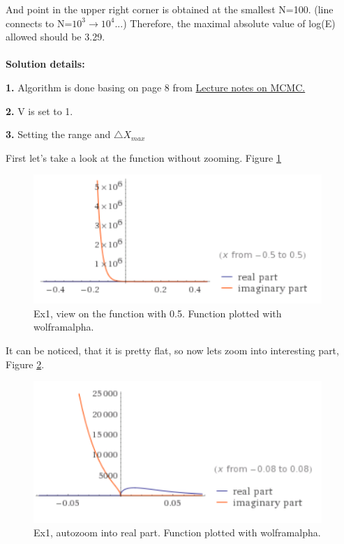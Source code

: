 \documentclass{article}
\begin{document}
And point in the upper right corner is obtained at the smallest N=100. (line connects to N=$10^3 \rightarrow 10^4 ...$) Therefore, the maximal absolute value of log(E) allowed should be 3.29.
\\
\\
\textbf{Solution details:}

	\textbf{1.} Algorithm is done basing on page 8 from \href{$https://moodle.helsinki.fi/pluginfile.php/714567/mod_resource/content/8/Markov_chain.pdf$}{Lecture notes on MCMC.}

	\textbf{2.} V is set to 1.
	
	\textbf{3.} Setting the range and $\triangle X_{max}$	

First let's take a look at the function without zooming. Figure \ref{fig:ex1_fig05}
\begin{figure}[!hbt]
	\centering
	\includegraphics[width=4.3in]{ex1_fig05}
	\caption{Ex1, view on the function with 0.5. Function plotted with wolframalpha.}
	\label{fig:ex1_fig05}
\end{figure}

It can be noticed, that it is pretty flat, so now lets zoom into interesting part, Figure \ref{fig:ex1_fig008}.

\begin{figure}[!hbt]
	\centering
	\includegraphics[width=4.3in]{ex1_fig008}
	\caption{Ex1, autozoom into real part. Function plotted with wolframalpha.}
	\label{fig:ex1_fig008}
\end{figure}
\end{document}

